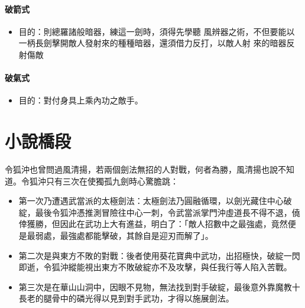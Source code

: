 \paragraph{破箭式}

\begin{itemize}
\item 目的：則總羅諸般暗器，練這一劍時，須得先學聽 風辨器之術，不但要能以一柄長劍擊開敵人發射來的種種暗器，還須借力反打，以敵人射 來的暗器反射傷敵
\end{itemize}

\paragraph{破氣式}

\begin{itemize}
\item 目的：對付身具上乘內功之敵手。
\end{itemize}

\section{小說橋段}
令狐沖也曾問過風清揚，若兩個劍法無招的人對戰，何者為勝，風清揚也說不知道。令狐沖只有三次在使獨孤九劍時心驚膽跳：
\begin{itemize}
\item 第一次乃遭遇武當派的太極劍法：太極劍法乃圓融循環，以劍光藏住中心破綻，最後令狐沖憑推測冒險往中心一刺，令武當派掌門沖虛道長不得不退，僥倖獲勝，但因此在武功上大有進益，明白了：「敵人招數中之最強處，竟然便是最弱處，最強處都能擊破，其餘自是迎刃而解了」。
\item 第二次是與東方不敗的對戰：後者使用葵花寶典中武功，出招極快，破綻一閃即逝，令狐沖縱能視出東方不敗破綻亦不及攻擊，與任我行等人陷入苦戰。
\item 第三次是在華山山洞中，因眼不見物，無法找到對手破綻，最後意外靠魔教十長老的腿骨中的磷光得以見到對手武功，才得以施展劍法。
\end{itemize}

